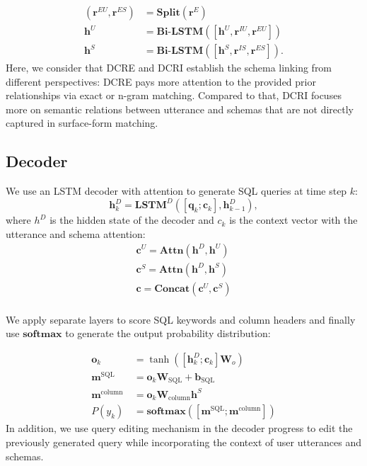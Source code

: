 \documentclass[letterpaper]{article} \usepackage{aaai21}  \usepackage{times}  \usepackage{helvet} \usepackage{courier}  \usepackage[hyphens]{url}  \usepackage{graphicx} \urlstyle{rm} \def\UrlFont{\rm}  \usepackage{natbib}  \usepackage{caption} \frenchspacing  \setlength{\pdfpagewidth}{8.5in}  \setlength{\pdfpageheight}{11in}
\begin{document}
\begin{equation}
\begin{aligned}
(\mathbf{r}^{EU}, \mathbf{r}^{ES}) &= \mathbf{Split}(\mathbf{r}^{E}) \\
\mathbf{h}^U &= \textbf{Bi-LSTM}([\mathbf{h}^U, \mathbf{r}^{IU}, \mathbf{r}^{EU}]) \\
\mathbf{h}^S &= \textbf{Bi-LSTM}([\mathbf{h}^S, \mathbf{r}^{IS}, \mathbf{r}^{ES}]) .
\label{hyb}
\end{aligned}
\end{equation}
Here, we consider that DCRE and DCRI establish the schema linking from different perspectives: DCRE pays more attention to the provided prior relationships via exact or n-gram matching. 
Compared to that, DCRI focuses more on semantic relations between utterance and schemas that are not directly captured in surface-form matching.

\subsection{Decoder}
\label{decoder}
We use an LSTM decoder with attention to generate SQL queries at time step $k$:
\begin{equation}
\mathbf{h}_{k}^{D}=\textbf{LSTM}^{D}\left(\left[\mathbf{q}_{k} ; \mathbf{c}_{k}\right], \mathbf{h}_{k-1}^{D}\right),
\end{equation}
where $h^D$ is the hidden state of the decoder and $c_k$ is the context vector with the utterance and schema attention:
\begin{equation}
\begin{aligned}
\mathbf{c}^U = \mathbf{Attn}(\mathbf{h}^{D}, \mathbf{h}^{U}) \\
\mathbf{c}^S = \mathbf{Attn}(\mathbf{h}^{D}, \mathbf{h}^{S}) \\
\mathbf{c} = \mathbf{Concat}(\mathbf{c}^U, \mathbf{c}^S) \\
\end{aligned}
\label{dcontext}
\end{equation}

We apply separate layers to score SQL keywords and column headers and finally use $\mathbf{softmax}$ to generate the output probability distribution:

\begin{equation}
\begin{aligned}
\mathbf{o}_{k} &=\tanh \left(\left[\mathbf{h}_{k}^{D} ; \mathbf{c}_{k}\right] \mathbf{W}_{o}\right) \\
\mathbf{m}^{\mathrm{SQL}} &=\mathbf{o}_{k} \mathbf{W}_{\mathrm{SQL}}+\mathbf{b}_{\mathrm{SQL}} \\
\mathbf{m}^{\text {column }} &=\mathbf{o}_{k} \mathbf{W}_{\mathrm{column}} \mathbf{h}^{S} \\
P\left(y_{k}\right) &=\mathbf{softmax}\left(\left[\mathbf{m}^{\mathrm{SQL}} ; \mathbf{m}^{\mathrm{column}}\right]\right)
\end{aligned}
\end{equation}
In addition, we use query editing mechanism \cite{DBLP:conf/emnlp/ZhangYESXLSXSR19} in the decoder progress to edit the previously generated query while incorporating the context of user utterances and schemas. 
\end{document}
